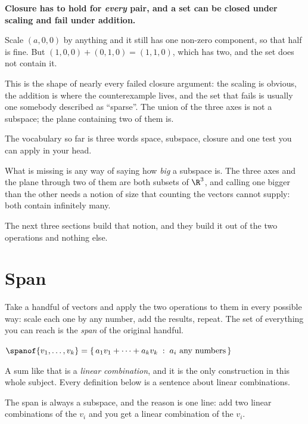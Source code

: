 \begin{fr}
\begin{trapbox}
\textbf{Closure has to hold for \emph{every} pair, and a set can be closed
under scaling and fail under addition.}

Scale $(a, 0, 0)$ by anything and it still has one non-zero component, so that
half is fine. But $(1, 0, 0) + (0, 1, 0) = (1, 1, 0)$, which has two, and the
set does not contain it.

This is the shape of nearly every failed closure argument: the scaling is
obvious, the addition is where the counterexample lives, and the set that fails
is usually one somebody described as \enquote{sparse}. The union of the three
axes is not a subspace; the plane containing two of them is.
\end{trapbox}
\end{fr}

\begin{fr}
The vocabulary so far is three words \dash{} space, subspace, closure \dash{}
and one test you can apply in your head.

What is missing is any way of saying how \emph{big} a subspace is. The three
axes and the plane through two of them are both subsets of $\R^{3}$, and calling
one bigger than the other needs a notion of size that counting the vectors
cannot supply: both contain infinitely many.

The next three sections build that notion, and they build it out of the two
operations and nothing else.
\end{fr}

\section{Span}
\label{sec:P04-span}

\begin{fr}
Take a handful of vectors and apply the two operations to them in every
possible way: scale each one by any number, add the results, repeat. The set of
everything you can reach is the \emph{span} of the original handful.

\medskip
\noindent
$\spanof\{v_1, \dots, v_k\}
  = \{\, a_1 v_1 + \dots + a_k v_k \;:\; a_i \text{ any numbers} \,\}$

\medskip
\noindent
A sum like that is a \emph{linear combination}, and it is the only construction
in this whole subject. Every definition below is a sentence about linear
combinations.

The span is always a subspace, and the reason is one line: add two linear
combinations of the $v_i$ and you get a linear combination of the $v_i$.
\end{fr}

